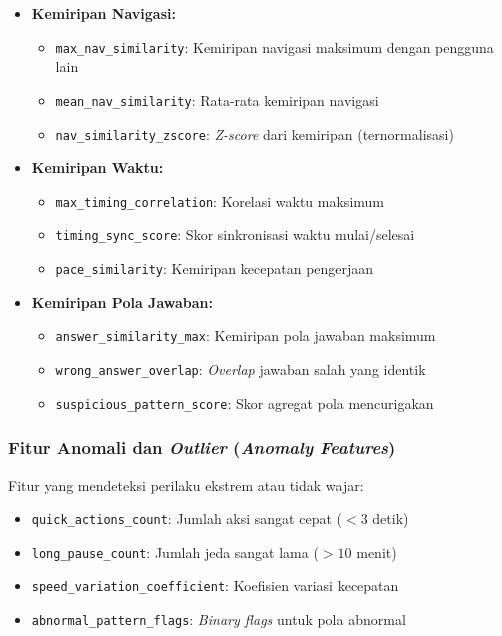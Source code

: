 \begin{itemize}
    \item \textbf{Kemiripan Navigasi:}
    \begin{itemize}
        \item \texttt{max\_nav\_similarity}: Kemiripan navigasi maksimum dengan pengguna lain
        \item \texttt{mean\_nav\_similarity}: Rata-rata kemiripan navigasi
        \item \texttt{nav\_similarity\_zscore}: \textit{Z-score} dari kemiripan (ternormalisasi)
    \end{itemize}
    
    \item \textbf{Kemiripan Waktu:}
    \begin{itemize}
        \item \texttt{max\_timing\_correlation}: Korelasi waktu maksimum
        \item \texttt{timing\_sync\_score}: Skor sinkronisasi waktu mulai/selesai
        \item \texttt{pace\_similarity}: Kemiripan kecepatan pengerjaan
    \end{itemize}
    
    \item \textbf{Kemiripan Pola Jawaban:}
    \begin{itemize}
        \item \texttt{answer\_similarity\_max}: Kemiripan pola jawaban maksimum
        \item \texttt{wrong\_answer\_overlap}: \textit{Overlap} jawaban salah yang identik
        \item \texttt{suspicious\_pattern\_score}: Skor agregat pola mencurigakan
    \end{itemize}
\end{itemize}

\subsubsection{Fitur Anomali dan \textit{Outlier} (\textit{Anomaly Features})}
\label{sec:fiturAnomali}

Fitur yang mendeteksi perilaku ekstrem atau tidak wajar:

\begin{itemize}
    \item \texttt{quick\_actions\_count}: Jumlah aksi sangat cepat ($<3$ detik)
    \item \texttt{long\_pause\_count}: Jumlah jeda sangat lama ($>10$ menit)
    \item \texttt{speed\_variation\_coefficient}: Koefisien variasi kecepatan
    \item \texttt{abnormal\_pattern\_flags}: \textit{Binary flags} untuk pola abnormal
\end{itemize}

